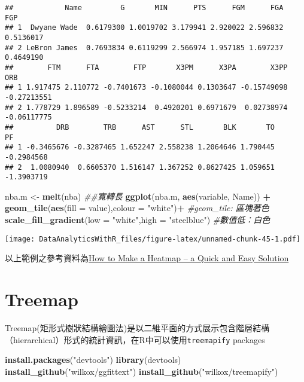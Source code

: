 \documentclass[
]{book}
\newenvironment{Shaded}{\begin{snugshade}}{\end{snugshade}}
\newcommand{\CommentTok}[1]{\textcolor[rgb]{0.56,0.35,0.01}{\textit{#1}}}
\newcommand{\DataTypeTok}[1]{\textcolor[rgb]{0.13,0.29,0.53}{#1}}
\newcommand{\KeywordTok}[1]{\textcolor[rgb]{0.13,0.29,0.53}{\textbf{#1}}}
\newcommand{\NormalTok}[1]{#1}
\newcommand{\OperatorTok}[1]{\textcolor[rgb]{0.81,0.36,0.00}{\textbf{#1}}}
\newcommand{\StringTok}[1]{\textcolor[rgb]{0.31,0.60,0.02}{#1}}
\begin{document}
\begin{verbatim}
##            Name         G       MIN      PTS      FGM      FGA       FGP
## 1  Dwyane Wade  0.6179300 1.0019702 3.179941 2.920022 2.596832 0.5136017
## 2 LeBron James  0.7693834 0.6119299 2.566974 1.957185 1.697237 0.4649190
##        FTM      FTA        FTP       X3PM      X3PA        X3PP         ORB
## 1 1.917475 2.110772 -0.7401673 -0.1080044 0.1303647 -0.15749098 -0.27213551
## 2 1.778729 1.896589 -0.5233214  0.4920201 0.6971679  0.02738974 -0.06117775
##          DRB        TRB      AST      STL       BLK       TO         PF
## 1 -0.3465676 -0.3287465 1.652247 2.558238 1.2064646 1.790445 -0.2984568
## 2  1.0080940  0.6605370 1.516147 1.367252 0.8627425 1.059651 -1.3903719
\end{verbatim}

\begin{Shaded}
\begin{Highlighting}[]
\NormalTok{nba.m <-}\StringTok{ }\KeywordTok{melt}\NormalTok{(nba) }\CommentTok{##寬轉長}
\KeywordTok{ggplot}\NormalTok{(nba.m, }\KeywordTok{aes}\NormalTok{(variable, Name)) }\OperatorTok{+}\StringTok{ }
\StringTok{    }\KeywordTok{geom_tile}\NormalTok{(}\KeywordTok{aes}\NormalTok{(}\DataTypeTok{fill =}\NormalTok{ value),}\DataTypeTok{colour =} \StringTok{"white"}\NormalTok{)}\OperatorTok{+}\StringTok{ }\CommentTok{#geom_tile: 區塊著色}
\StringTok{    }\KeywordTok{scale_fill_gradient}\NormalTok{(}\DataTypeTok{low =} \StringTok{"white"}\NormalTok{,}\DataTypeTok{high =} \StringTok{"steelblue"}\NormalTok{) }\CommentTok{#數值低：白色}
\end{Highlighting}
\end{Shaded}

\texttt{[image: DataAnalyticsWithR\_files/figure-latex/unnamed-chunk-45-1.pdf]}

以上範例之參考資料為\href{http://flowingdata.com/2010/01/21/how-to-make-a-heatmap-a-quick-and-easy-solution/}{How to Make a Heatmap -- a Quick and Easy Solution}

\hypertarget{treemap}{%
\section{Treemap}\label{treemap}}

Treemap(矩形式樹狀結構繪圖法)是以二維平面的方式展示包含階層結構（hierarchical）形式的統計資訊，在R中可以使用\texttt{treemapify}\citep{R-treemapify} packages

\begin{Shaded}
\begin{Highlighting}[]
\KeywordTok{install.packages}\NormalTok{(}\StringTok{"devtools"}\NormalTok{)}
\KeywordTok{library}\NormalTok{(devtools)}
\KeywordTok{install_github}\NormalTok{(}\StringTok{"wilkox/ggfittext"}\NormalTok{)}
\KeywordTok{install_github}\NormalTok{(}\StringTok{"wilkox/treemapify"}\NormalTok{) }
\end{Highlighting}
\end{Shaded}
\end{document}
